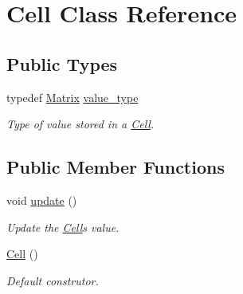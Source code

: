 \hypertarget{classCell}{}\section{Cell Class Reference}
\label{classCell}
\subsection*{Public Types}
\begin{DoxyCompactItemize}
\item 
\hypertarget{classCell_a10efbda08c279c3b66d62b7da19b49b9}{}typedef \hyperlink{classMatrix}{Matrix} \hyperlink{classCell_a10efbda08c279c3b66d62b7da19b49b9}{value\+\_\+type}\label{classCell_a10efbda08c279c3b66d62b7da19b49b9}

\begin{DoxyCompactList}\small\item\em Type of value stored in a \hyperlink{classCell}{Cell}. \end{DoxyCompactList}\end{DoxyCompactItemize}
\subsection*{Public Member Functions}
\begin{DoxyCompactItemize}
\item 
\hypertarget{classCell_aed364ed0f58e1ef888e72567c1c66757}{}void \hyperlink{classCell_aed364ed0f58e1ef888e72567c1c66757}{update} ()\label{classCell_aed364ed0f58e1ef888e72567c1c66757}

\begin{DoxyCompactList}\small\item\em Update the \hyperlink{classCell}{Cell}\textquotesingle{}s value. \end{DoxyCompactList}\item 
\hypertarget{classCell_a394510643e8664cf12b5efaf5cb99f71}{}\hyperlink{classCell_a394510643e8664cf12b5efaf5cb99f71}{Cell} ()\label{classCell_a394510643e8664cf12b5efaf5cb99f71}

\begin{DoxyCompactList}\small\item\em Default construtor. \end{DoxyCompactList}\end{DoxyCompactItemize}
